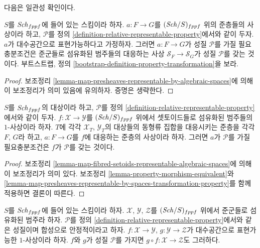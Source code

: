 \noindent
다음은 일관성 확인이다.

\begin{lemma}
\label{lemma-map-presheaves-representable-by-spaces-transformation-property}
$S$를 $\mathit{Sch}_{fppf}$에 들어 있는 스킴이라 하자. $a : F \to G$를
$(\mathit{Sch}/S)_{fppf}$ 위의 준층들의 사상이라 하고, $\mathcal{P}$를 정의
\ref{definition-relative-representable-property}에서와 같이 두자.
$a$가 대수공간으로 표현가능하다고 가정하자. 그러면
$a : F \to G$가 성질 $\mathcal{P}$를 가질 필요충분조건은 준군들로
섬유화된 범주들의 대응하는 사상 $\mathcal{S}_F \to \mathcal{S}_G$가
성질 $\mathcal{P}$를 갖는 것이다. 부트스트랩, 정의
\ref{bootstrap-definition-property-transformation}을 보라.
\end{lemma}

\begin{proof}
보조정리 \ref{lemma-map-presheaves-representable-by-algebraic-spaces}에
의해 이 보조정리가 의미 있음에 유의하자. 증명은 생략한다.
\end{proof}

\begin{lemma}
\label{lemma-map-fibred-setoids-property}
$S$를 $\mathit{Sch}_{fppf}$의 대상이라 하고, $\mathcal{P}$를 정의
\ref{definition-relative-representable-property}에서와 같이 두자.
$f : \mathcal{X} \to \mathcal{Y}$를 $(\mathit{Sch}/S)_{fppf}$ 위에서
셋토이드들로 섬유화된 범주들의 $1$-사상이라 하자. $T$에 각각
$\mathcal{X}_T$, $\mathcal{Y}_T$의 대상들의 동형류 집합을 대응시키는
준층을 각각 $F$, $G$라 하고, $a : F \to G$를 $f$에 대응하는 준층의
사상이라 하자. 그러면 $a$가 $\mathcal{P}$를 가질 필요충분조건은
$f$가 $\mathcal{P}$를 갖는 것이다.
\end{lemma}

\begin{proof}
보조정리 \ref{lemma-map-fibred-setoids-representable-algebraic-spaces}에
의해 이 보조정리가 의미 있다. 보조정리
\ref{lemma-property-morphism-equivalent}와
\ref{lemma-map-presheaves-representable-by-spaces-transformation-property}를
함께 적용하면 결론이 따른다.
\end{proof}

\begin{lemma}
\label{lemma-composition-representable-transformations-property}
$S$를 $\mathit{Sch}_{fppf}$에 들어 있는 스킴이라 하자.
$\mathcal{X}$, $\mathcal{Y}$, $\mathcal{Z}$를 $(\mathit{Sch}/S)_{fppf}$ 위에서
준군들로 섬유화된 범주라 하자. $\mathcal{P}$를 정의
\ref{definition-relative-representable-property}에서와 같은 성질이며
합성으로 안정적이라고 하자. $f : \mathcal{X} \to \mathcal{Y}$,
$g : \mathcal{Y} \to \mathcal{Z}$가 대수공간으로 표현가능한
$1$-사상이라 하자. $f$와 $g$가 성질 $\mathcal{P}$를 가지면
$g \circ f : \mathcal{X} \to \mathcal{Z}$도 그러하다.
\end{lemma}

